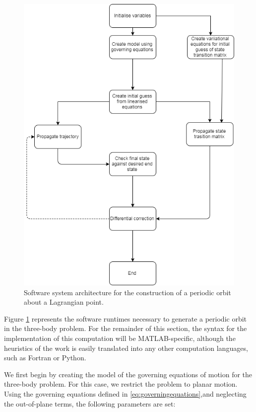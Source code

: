 \begin{figure}
\centering
\includegraphics[height = .4\textheight]{figures/softwareFlow}
\caption{Software system architecture for the construction of a periodic orbit about a Lagrangian point.}
\label{f:periodicsoftwareflow}
\end{figure}


Figure \ref{f:periodicsoftwareflow} represents the software runtimes necessary to generate a periodic orbit in the three-body problem. For the remainder of this section, the syntax for the implementation of this computation will be MATLAB-specific, although the heuristics of the work is easily translated into any other computation languages, such as Fortran or Python. 


We first begin by creating the model of the governing equations of motion for the three-body problem. For this case, we restrict the problem to planar motion. Using the governing equations defined in \ref{eq:governingequations},and neglecting the out-of-plane terms, the following parameters are set:

